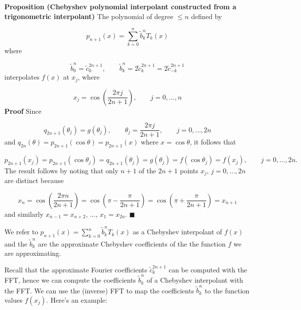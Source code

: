 \documentclass[12pt,a4paper]{article}
\begin{document}
\textbf{Proposition (Chebyshev polynomial interpolant constructed from a trigonometric interpolant)} The polynomial of degree $\leq n$ defined by 

\[
p_{n+1}(x) = \sum_{k=0}^{n} \tilde{b}_k^nT_k(x) 
\]
where

\[
\tilde{b}_0^n = \tilde{c}_0^{2n+1}, \qquad \tilde{b}_k^n = 2\tilde{c}_k^{2n+1}  = 2\tilde{c}_{-k}^{2n+1}
\]
interpolates $f(x)$  at $x_{j}$, where

\[
x_j = \cos\left( \frac{2\pi j}{2n + 1}  \right), \qquad j = 0, \ldots, n
\]
\textbf{Proof} Since 

\[
q_{2n+1}(\theta_j) = g(\theta_j), \qquad \theta_j = \frac{2\pi j}{2n+ 1}, \qquad j = 0, \ldots, 2n
\]
and $q_{2n}(\theta) = p_{2n+1}(\cos \theta) = p_{2n+1}(x)$ where $x = \cos\theta$, it follows that

\[
p_{2n+1}(x_j) =p_{2n+1}(\cos \theta_j) = q_{2n+1}(\theta_j) = g(\theta_j) = f(\cos\theta_j) = f(x_j), \qquad j = 0, \ldots, 2n.
\]
The result follows by noting that only $n+1$ of the $2n+1$ points $x_j$, $j = 0, \ldots, 2n$ are distinct because

\[
x_{n} = \cos\left( \frac{2\pi n}{2n + 1}  \right)= \cos\left( \pi - \frac{\pi}{2n + 1}  \right) =  \cos\left( \pi + \frac{\pi}{2n + 1}  \right) = x_{n+1}
\]
and similarly $x_{n-1} = x_{n+2}$, $\ldots$, $x_1 = x_{2n}$.  $\blacksquare$

We refer to $p_{n+1}(x) = \sum_{k=0}^{n} \tilde{b}_k^nT_k(x)$ as a Chebyshev interpolant of $f(x)$ and the $\tilde{b}_k^n$ are the approximate Chebyshev coefficients of the the function $f$ we are approximating.

Recall that the approximate Fourier coefficients $\tilde{c}^{2n+1}_k$ can be computed with the FFT, hence we can compute the coefficients $\tilde{b}^n_k$ of a Chebyshev interpolant with the FFT.  We can use the (inverse) FFT to map the coefficients $\tilde{b}^n_k$ to the function values $f(x_j)$. Here's an example:
\end{document}

